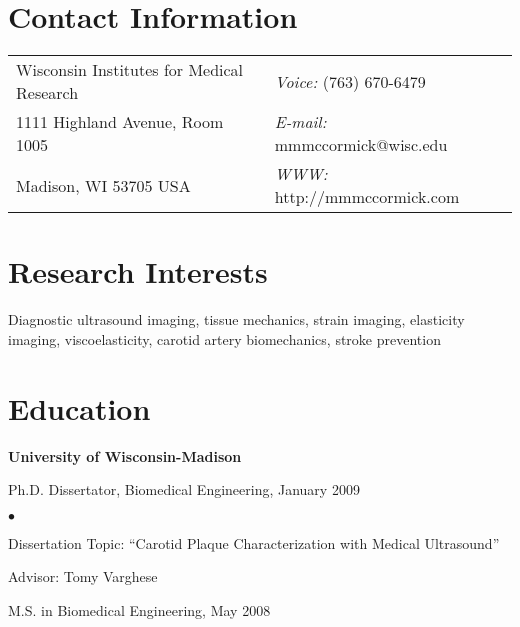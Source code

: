 \documentclass[margin,line]{res}
\newenvironment{list1}{
  \begin{list}{\ding{113}}{%
      \setlength{\itemsep}{0in}
      \setlength{\parsep}{0in} \setlength{\parskip}{0in}
      \setlength{\topsep}{0in} \setlength{\partopsep}{0in} 
      \setlength{\leftmargin}{0.17in}}}{\end{list}}
\newenvironment{list2}{
  \begin{list}{$\bullet$}{%
      \setlength{\itemsep}{0in}
      \setlength{\parsep}{0in} \setlength{\parskip}{0in}
      \setlength{\topsep}{0in} \setlength{\partopsep}{0in} 
      \setlength{\leftmargin}{0.2in}}}{\end{list}}
\begin{document}

\begin{resume}
\section{\sc Contact Information}
\vspace{.05in}
\begin{tabular}{@{}p{3in}p{4in}}
Wisconsin Institutes for Medical Research & {\it Voice:}  (763) 670-6479 \\            
1111 Highland Avenue, Room 1005           & {\it E-mail:}  mmmccormick@wisc.edu \\       
Madison, WI 53705 USA                     & {\it WWW:} http://mmmccormick.com\\     
\end{tabular}


\section{\sc Research Interests}
Diagnostic ultrasound imaging, tissue mechanics, strain imaging, elasticity imaging, viscoelasticity, carotid artery biomechanics, stroke prevention

\section{\sc Education}
{\bf University of Wisconsin-Madison} \\
\vspace*{-.1in}
\begin{list1}
\item[] Ph.D. Dissertator, Biomedical Engineering, January 2009
\begin{list2}
\vspace*{.05in}
\item Dissertation Topic:  ``Carotid Plaque Characterization with Medical
Ultrasound''
\item Advisor:  Tomy Varghese
\end{list2}
\vspace*{.05in}
\item[] M.S. in Biomedical Engineering, May 2008
\end{list1}


\end{resume}
\end{document}

